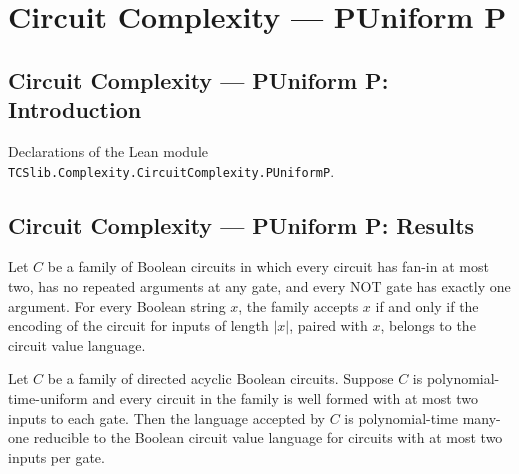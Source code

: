 \section{Circuit Complexity --- PUniform P}
\subsection*{Circuit Complexity --- PUniform P: Introduction}

Declarations of the Lean module \texttt{TCSlib.Complexity.CircuitComplexity.PUniformP}.

\subsection*{Circuit Complexity --- PUniform P: Results}

\begin{theorem}
\label{BoolCircuit.DAGCircuitFamily.mem_language_iff_pairEncode_mem_CVAL}
\leanok
{}
Let $C$ be a family of Boolean circuits in which every circuit has fan-in at most two,
has no repeated arguments at any gate, and every NOT gate has exactly one argument. For
every Boolean string $x$, the family accepts $x$ if and only if the encoding of the
circuit for inputs of length $|x|$, paired with $x$, belongs to the circuit value
language.
\end{theorem}

\begin{theorem}
\label{BoolCircuit.DAGCircuitFamily.IsPUniform.polyTimeReducible_CVAL}
\leanok
{}
Let $C$ be a family of directed acyclic Boolean circuits. Suppose $C$ is
polynomial-time-uniform and every circuit in the family is well formed with at most two
inputs to each gate. Then the language accepted by $C$ is polynomial-time many-one
reducible to the Boolean circuit value language for circuits with at most two inputs per
gate.
\end{theorem}

